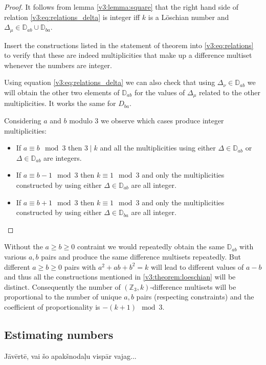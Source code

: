 \begin{proof}
	It follows from lemma \ref{v3:lemma:square} that the right hand side of relation \eqref{v3:eq:relations_delta} is integer iff $k$ is a Löschian number and $\Delta_\mu \in \mathbb D_{ab} \cup \mathbb D_{ba}$.
	
	Insert the constructions listed in the statement of theorem into \eqref{v3:eq:relations} to verify that these are indeed multiplicities that make up a difference multiset whenever the numbers are integer.
	
	Using equation \eqref{v3:eq:relations_delta} we can also check that using $\Delta_\nu \in \mathbb D_{ab}$ we will obtain the other two elements of $\mathbb D_{ab}$ for the values of $\Delta_\mu$ related to the other multiplicities. It works the same for $D_{ba}$.
	
	Considering $a$ and $b$ modulo $3$ we observe which cases produce integer multiplicities:
	\begin{itemize}
		\item If $a \equiv b \mod 3$ then $3 \mid k$ and all the multiplicities using either $\Delta \in \mathbb D_{ab}$ or $\Delta \in \mathbb D_{ab}$ are integers.
		\item If $a \equiv b-1 \mod 3$ then $k \equiv 1 \mod 3$ and only the multiplicities constructed by using either $\Delta \in \mathbb D_{ab}$ are all integer.
		\item If $a \equiv b+1 \mod 3$ then $k \equiv 1 \mod 3$ and only the multiplicities constructed by using either $\Delta \in \mathbb D_{ba}$ are all integer.
	\end{itemize}
\end{proof}

\begin{remark}
    Without the $a \geq b \geq 0$ contraint we would repeatedly obtain the same $\mathbb D_{ab}$ with various $a,b$ pairs and produce the same difference multisets repeatedly.	But different $a \geq b \geq 0$ pairs with $a^2+ab+b^2=k$ will lead to different values of $a-b$ and thus all the constructions mentioned in \ref{v3:theorem:loeschian} will be distinct. Consequently the number of $(\mathbb Z_3,k)$-difference multisets will be proportional to the number of unique $a,b$ pairs (respecting constraints) and the coefficient of proportionality is $-(k+1) \mod 3$.
\end{remark}

\subsection{Estimating numbers}
    Jāvērtē, vai šo apakšnodaļu vispār vajag...

